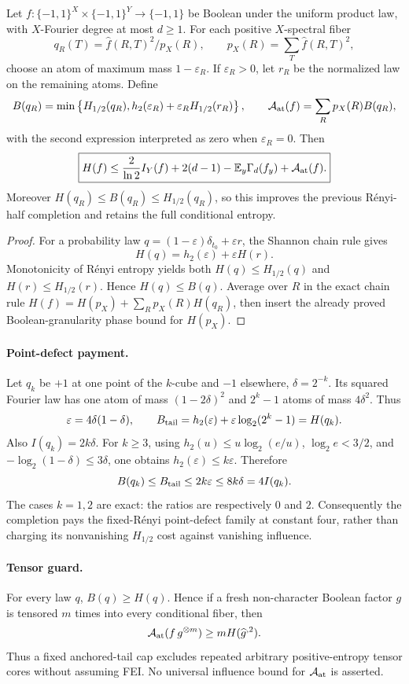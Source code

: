 \begin{theorem}
Let $f:\{-1,1\}^X\times\{-1,1\}^Y\to\{-1,1\}$ be Boolean under the
uniform product law, with $X$-Fourier degree at most $d\ge1$.  For each
positive $X$-spectral fiber
\[
 q_R(T)=\widehat f(R,T)^2/p_X(R),
 \qquad p_X(R)=\sum_T\widehat f(R,T)^2,
\]
choose an atom of maximum mass $1-\varepsilon_R$.  If
$\varepsilon_R>0$, let $r_R$ be the normalized law on the remaining
atoms.  Define
\[
 B(q_R)=\min\left\{
 H_{1/2}(q_R),
 h_2(\varepsilon_R)+\varepsilon_R H_{1/2}(r_R)
 \right\},
 \qquad
 \mathcal A_{\rm at}(f)=\sum_Rp_X(R)B(q_R),
\]
with the second expression interpreted as zero when $\varepsilon_R=0$.
Then
\[
 \boxed{
 H(f)\le {2\over\ln2}I_Y(f)+2(d-1)
 -\mathbb E_y\Gamma_d(f_y)+\mathcal A_{\rm at}(f).}
\]
Moreover $H(q_R)\le B(q_R)\le H_{1/2}(q_R)$, so this improves the
previous R\'enyi-half completion and retains the full conditional
entropy.
\end{theorem}

\begin{proof}
For a probability law $q=(1-\varepsilon)\delta_{t_0}+\varepsilon r$,
the Shannon chain rule gives
\[
 H(q)=h_2(\varepsilon)+\varepsilon H(r).
\]
Monotonicity of R\'enyi entropy yields both
$H(q)\le H_{1/2}(q)$ and $H(r)\le H_{1/2}(r)$.  Hence $H(q)\le B(q)$.
Average over $R$ in the exact chain rule
$H(f)=H(p_X)+\sum_Rp_X(R)H(q_R)$, then insert the already proved
Boolean-granularity phase bound for $H(p_X)$.
\end{proof}

\paragraph{Point-defect payment.}
Let $q_k$ be $+1$ at one point of the $k$-cube and $-1$ elsewhere,
$\delta=2^{-k}$.  Its squared Fourier law has one atom of mass
$(1-2\delta)^2$ and $2^k-1$ atoms of mass $4\delta^2$.  Thus
\[
 \varepsilon=4\delta(1-\delta),\qquad
 B_{\rm tail}=h_2(\varepsilon)+\varepsilon\log_2(2^k-1)=H(q_k).
\]
Also $I(q_k)=2k\delta$.  For $k\ge3$, using
$h_2(u)\le u\log_2(e/u)$, $\log_2e<3/2$, and
$-\log_2(1-\delta)\le3\delta$, one obtains
$h_2(\varepsilon)\le k\varepsilon$.  Therefore
\[
 B(q_k)\le B_{\rm tail}\le2k\varepsilon
 \le8k\delta=4I(q_k).
\]
The cases $k=1,2$ are exact: the ratios are respectively $0$ and $2$.
Consequently the completion pays the fixed-R\'enyi point-defect family
at constant four, rather than charging its nonvanishing
$H_{1/2}$ cost against vanishing influence.

\paragraph{Tensor guard.}
For every law $q$, $B(q)\ge H(q)$.  Hence if a fresh non-character
Boolean factor $g$ is tensored $m$ times into every conditional fiber,
then
\[
 \mathcal A_{\rm at}(f\,g^{\otimes m})
 \ge mH(\widehat g^{,2}).
\]
Thus a fixed anchored-tail cap excludes repeated arbitrary
positive-entropy tensor cores without assuming FEI.  No universal
influence bound for $\mathcal A_{\rm at}$ is asserted.
